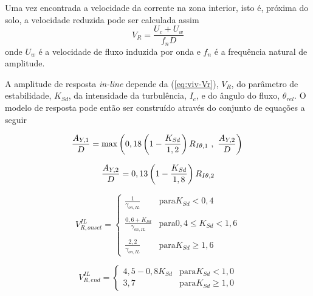 Uma vez encontrada a velocidade da corrente na zona interior, isto é, próxima do solo, a velocidade reduzida pode ser calculada assim
\begin{equation}
\label{eq:viv-Vr}
V_R = \frac{U_c + U_w}{f_n D}
\end{equation}
onde $U_w$ é a velocidade de fluxo induzida por onda e $f_n$ é a frequência natural de amplitude.

A amplitude de resposta \textit{in-line} depende da  (\autoref{eq:viv-Vr}), $V_R$, do parâmetro de estabilidade, $K_\mathit{Sd}$, da intensidade da turbulência, $\mathit{I}_c$, e do ângulo do fluxo, $\theta_\mathit{rel}$.
O modelo de resposta pode então ser construído através do conjunto de equações a seguir

\begin{equation}
\label{eq:viv-Vronset}
\frac{A_{Y,1}}{D} = \max\left(0,18 \left(1 - \frac{K_\mathit{Sd}}{1,2}\right) R_{I\theta,1} ~,~\frac{A_{Y,2}}{D}\right)\\
\end{equation}

\begin{equation}
\frac{A_{Y,2}}{D} = 0,13 \left(1 - \frac{K_\mathit{Sd}}{1,8}\right) R_{I\theta,2}\\
\end{equation}

\begin{equation}
V_{R,\mathit{onset}}^\mathit{IL} =
\begin{cases}
\frac{1}{ \gamma_{\mathit{on}, \mathit{IL}} }                 & \mathrm{para} K_\mathit{Sd} < 0,4\\
\\
\frac{0,6 + K_\mathit{Sd}}{\gamma_{\mathit{on}, \mathit{IL}}} & \mathrm{para} 0,4 \leq K_\mathit{Sd} < 1,6 \\
\\
\frac{2,2}{\gamma_{\mathit{on}, \mathit{IL}}}                 & \mathrm{para} K_\mathit{Sd} \geq 1,6
\end{cases}
\end{equation}

\begin{equation}
V_{R, \mathit{end}}^\mathit{IL} =
\begin{cases}
4,5 - 0,8 K_\mathit{Sd} & \mathrm{para} K_\mathit{Sd} < 1,0 \\
3,7                     & \mathrm{para} K_\mathit{Sd} \geq 1,0
\end{cases}
\end{equation}

